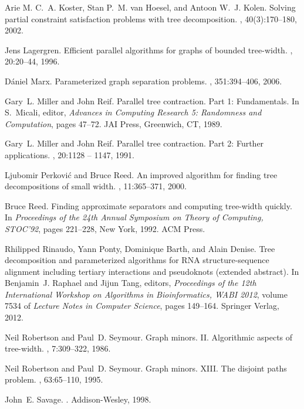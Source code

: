 \documentclass[a4paper,11pt]{article}
\theoremstyle{definition}
\theoremstyle{remark}
\begin{document}
\begin{thebibliography}{10}
Arie M. C.~A. Koster, Stan P.~M. van Hoesel, and Antoon W.~J. Kolen.
\newblock Solving partial constraint satisfaction problems with tree
  decomposition.
, 40(3):170--180, 2002.

Jens Lagergren.
\newblock Efficient parallel algorithms for graphs of bounded tree-width.
, 20:20--44, 1996.

D\'{a}niel Marx.
\newblock Parameterized graph separation problems.
, 351:394--406, 2006.

Gary~L. Miller and John Reif.
\newblock Parallel tree contraction. {P}art 1: {F}undamentals.
\newblock In S.~Micali, editor, {\em Advances in Computing Research 5:
  Randomness and Computation}, pages 47--72. JAI Press, Greenwich, CT, 1989.

Gary~L. Miller and John Reif.
\newblock Parallel tree contraction. {P}art 2: {F}urther applications.
, 20:1128 -- 1147, 1991.

Ljubomir Perkovi{\'{c}} and Bruce Reed.
\newblock An improved algorithm for finding tree decompositions of small width.
,
  11:365--371, 2000.

Bruce Reed.
\newblock Finding approximate separators and computing tree-width quickly.
\newblock In {\em Proceedings of the 24th Annual Symposium on Theory of
  Computing, STOC'92}, pages 221--228, New York, 1992. ACM Press.

Rhilipped Rinaudo, Yann Ponty, Dominique Barth, and Alain Denise.
\newblock Tree decomposition and parameterized algorithms for {RNA}
  structure-sequence alignment including tertiary interactions and pseudoknots
  (extended abstract).
\newblock In Benjamin~J. Raphael and Jijun Tang, editors, {\em Proceedings of
  the 12th International Workshop on Algorithms in Bioinformatics, WABI 2012},
  volume 7534 of {\em Lecture Notes in Computer Science}, pages 149--164.
  Springer Verlag, 2012.

Neil Robertson and Paul~D. Seymour.
\newblock Graph minors. {II}. {A}lgorithmic aspects of tree-width.
, 7:309--322, 1986.

Neil Robertson and Paul~D. Seymour.
\newblock Graph minors. {XIII}. {T}he disjoint paths problem.
, 63:65--110, 1995.

John~E. Savage.
.
\newblock Addison-Wesley, 1998.

\end{thebibliography}
\end{document}
